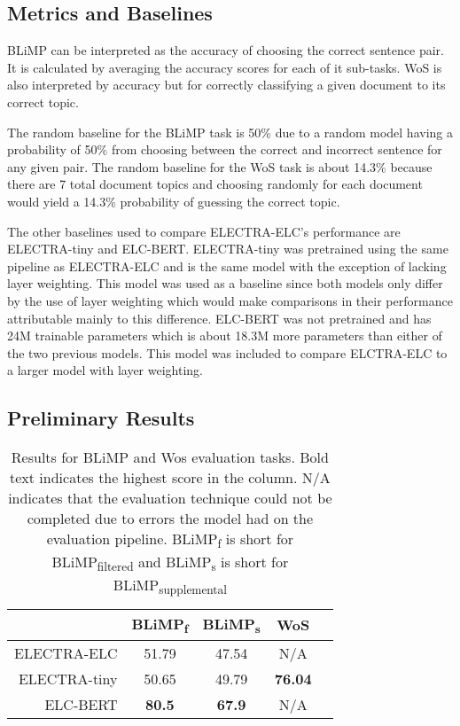 \documentclass[11pt]{article}
\begin{document}
\subsection{Metrics and Baselines}

BLiMP can be interpreted as the accuracy of choosing the correct sentence pair. It is
calculated by averaging the accuracy scores for each of it sub-tasks. WoS is also 
interpreted by
accuracy but for correctly classifying a given document to its correct topic.

The random baseline for the BLiMP task is 50\% due to a random model having a probability
of 50\% from choosing between the correct and incorrect sentence for any given pair. The random baseline for the WoS task is about 14.3\% because there are 7 total document topics
and choosing randomly for each document would yield a 14.3\% probability of guessing the
correct topic.

The other baselines used to compare ELECTRA-ELC's performance are ELECTRA-tiny and ELC-BERT.
ELECTRA-tiny was pretrained using the same pipeline as ELECTRA-ELC and is the same model
with the exception of lacking layer weighting. 
This model was used as a baseline since both models only differ by the use of layer weighting
which would make comparisons in their performance attributable mainly to this difference.
ELC-BERT was not pretrained and has 24M trainable parameters \cite{charpentier2023layersequallyimportantlayer} which is about 18.3M more parameters than either of the two previous models. This model was included to compare ELCTRA-ELC to a larger
model with layer weighting.


\subsection{Preliminary Results}

\begin{table} 
    \centering
    \begin{tabular}{r|c|c|c|c}
             & \textbf{BLiMP\textsubscript{f}} & \textbf{BLiMP\textsubscript{s}} & \textbf{WoS} & \\
             \hline
        ELECTRA-ELC & 51.79 & 47.54 & N/A & \\
        ELECTRA-tiny & 50.65 & 49.79 & \textbf{76.04} & \\
        ELC-BERT & \textbf{80.5} & \textbf{67.9} & N/A & \\
    \end{tabular}
    \caption{Results for BLiMP and Wos evaluation tasks. Bold text indicates the highest score in the column. N/A indicates that the evaluation technique could not
    be completed due to errors the model had on the evaluation pipeline. BLiMP\textsubscript{f} is short for BLiMP\textsubscript{filtered} and BLiMP\textsubscript{s} is short for BLiMP\textsubscript{supplemental}}
    \label{tab:results_table}
\end{table}
\end{document}
